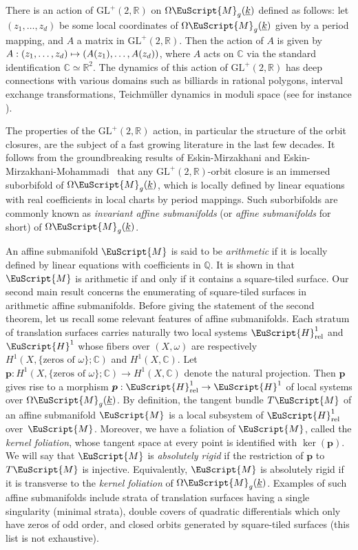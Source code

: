 \documentclass[JEP,XML,SOM,Unicode]{cedram}
\let\mathcal\EuScript
\newcommand\mto{\mathchoice{\longmapsto}{\mapsto}{\mapsto}{\mapsto}}
\newcommand{\rel}{\mathrm{rel}}
\theoremstyle{plain}
\theoremstyle{definition}
\newcommand{\R}{\mathbb{R}}
\def\C{\mathbb{C}}
\newcommand{\Q}{\mathbb{Q}}
\newcommand{\pp}{\boldsymbol{p}}
\newcommand{\Mcal}{\mathcal{M}}
\newcommand{\cH}{\mathcal{H}}
\newcommand{\cM}{\mathcal{M}}
\newcommand{\GL}{\mathrm{GL}}
\let\ul\underline
\newcommand{\trate}{\Omega\Mcal_{g}(\ul{k})}
\begin{document}
There is an action of $\GL^+(2,\R)$ on $\trate$ defined as follows: let $(z_1,\dots,z_d)$ be some local coordinates of $\trate$ given by a period mapping, and $A$ a matrix in $\GL^+(2,\R)$. Then the action of $A$ is given by $A: (z_1,\dots,z_d) \mto (A(z_1),\dots,A(z_d))$, where $A$ acts on $\C$ via the standard identification $\C\simeq \R^2$. The dynamics of this action of $\GL^+(2,\R)$ has deep connections with various domains such as billiards in rational polygons, interval exchange transformations, Teichmüller dynamics in moduli space (see for instance \cite{MaTa02, Zorich:survey}).

The properties of the $\GL^+(2,\R)$ action, in particular the structure of the orbit closures, are the subject of a fast growing literature in the last few decades. It follows from the groundbreaking results of Eskin-Mirzakhani \cite{EM18} and Eskin-Mirzakhani-Mohammadi~\cite{EMM15} that any $\GL^+(2,\R)$-orbit closure is an immersed suborbifold of $\trate$, which is locally defined by linear equations with real coefficients in local charts by period mappings. Such suborbifolds are commonly known as \emph{invariant affine submanifolds} (or \emph{affine submanifolds} for short) of $\trate$.

An affine submanifold $\cM$ is said to be \emph{arithmetic} if it is locally defined by linear equations with coefficients in $\Q$. It is shown in \cite{Wright14} that $\Mcal$ is arithmetic if and only if it contains a square-tiled surface.
Our second main result concerns the enumerating of square-tiled surfaces in arithmetic affine submanifolds.
Before giving the statement of the second theorem, let us recall some relevant features of affine submanifolds.
Each stratum of translation surfaces carries naturally two local systems $\cH^1_{\rel}$ and $\cH^1$ whose fibers over $(X,\omega)$ are respectively $H^1(X,\{\textrm{zeros of } \omega\};\C)$ and $H^1(X,\C)$. Let $\pp: H^1(X,\{\textrm{zeros of } \omega\};\C) \to H^1(X,\C)$ denote the natural projection. Then $\pp$ gives rise to a morphism $\pp: \cH^1_{\rel} \to \cH^1$ of local systems over $\trate$.
By definition, the tangent bundle $T\cM$ of an affine submanifold $\cM$ is a local subsystem of $\cH^1_{\rel}$ over~$\cM$.
Moreover, we have a foliation of $\cM$, called the \emph{kernel foliation}, whose tangent space at every point is identified with $\ker(\pp)$.
We will say that $\Mcal$ is \emph{absolutely rigid} if the restriction of $\pp$ to $T\Mcal$ is injective.
Equivalently, $\Mcal$ is absolutely rigid if it is transverse to the \emph{kernel foliation} of $\trate$.
Examples of such affine submanifolds include strata of translation surfaces having a single singularity (minimal strata), double covers of quadratic differentials which only have zeros of odd order, and closed orbits generated by square-tiled surfaces (this list is not exhaustive).
\end{document}
